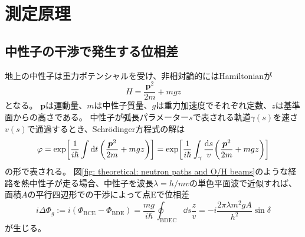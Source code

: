 \documentclass[dvipdfmx]{jsarticle}
\begin{document}
\section{測定原理}


\subsection{中性子の干渉で発生する位相差}

地上の中性子は重力ポテンシャルを受け、非相対論的にはHamiltonianが
\begin{equation*}
    H
    =
    \frac{\bm{p}^2}{2m}+mgz
\end{equation*}
となる。
$\bm{p}$は運動量、$m$は中性子質量、$g$は重力加速度でそれぞれ定数、$z$は基準面からの高さである。
中性子が弧長パラメーター$s$で表される軌道$\gamma(s)$を速さ$v(s)$で通過するとき、Schrödinger方程式の解は
\begin{equation*}
    \varphi
    =
    \exp[
        \frac{1}{i\hbar}\int\dd{t}
        \qty(
            \frac{\bm{p}^2}{2m}+mgz
        )
    ]
    =
    \exp[
        \frac{1}{i\hbar}\int_\gamma\frac{\dd{s}}{v}
        \qty(\frac{\bm{p}^2}{2m}+mgz)
    ]
\end{equation*}
の形で表される。
図\ref{fig: theoretical: neutron paths and O/H beams}のような経路を熱中性子が走る場合、中性子を波長$\lambda=h/mv$の単色平面波で近似すれば、面積$A$の平行四辺形での干渉によって点Eで位相差
\begin{equation}
    \label{eq: theoretical: delta phi g ideal}
    i\Delta\Phi_g
    :=
    i(\Phi_\mathrm{BCE}-\Phi_\mathrm{BDE})
    =
    \frac{mg}{i\hbar}
    \oint_\mathrm{BDEC}\dd{s}\frac{z}{v}
    =
    -i\frac{2\pi\lambda m^2gA}{h^2}\sin\delta
\end{equation}
が生じる。
\end{document}
